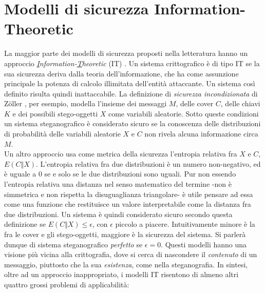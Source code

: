 	\section{Modelli di sicurezza Information-Theoretic}
	La maggior parte dei modelli di sicurezza proposti nella letteratura hanno un approccio \textit{\underline{I}nformation-\underline{T}heoretic} (IT) \cite{sec}. Un sistema crittografico è di tipo IT se la sua sicurezza deriva dalla teoria dell'informazione, che ha come assunzione principale la potenza di calcolo illimitata dell'entità attaccante. Un sistema così definito risulta quindi inattaccabile. La definizione di \textit{sicurezza incondizionata} di Z\"oller \cite{zoller}, per esempio, modella l'insieme dei messaggi $M$, delle cover $C$, delle chiavi $K$ e dei possibili stego-oggetti $X$ come variabili aleatorie. Sotto queste condizioni un sistema steganografico è considerato sicuro se la conoscenza delle distribuzioni di probabilità delle variabili aleatorie $X$ e $C$ non rivela alcuna informazione circa $M$.\\Un altro approccio \cite{approach} usa come metrica della sicurezza l'entropia relativa fra $X$ e $C$, $E(C\Vert X)$. L'entropia relativa fra due distribuzioni è un numero non-negativo, ed è uguale a $0$ se e solo se le due distribuzioni sono uguali. Pur non essendo l'entropia relativa una distanza nel senso matematico del termine -non è simmetrica e non rispetta la disuguaglianza triangolare- è utile pensare ad essa come una funzione che restituisce un valore interpretabile come la distanza fra due distribuzioni. Un sistema è quindi considerato sicuro secondo questa definizione se $E(C\Vert X) \leq \epsilon$, con $\epsilon$ piccolo a piacere. Intuitivamente minore è la  fra le cover e gli stego-oggetti, maggiore è la sicurezza del sistema. Si parlerà dunque di sistema steganografico \textit{perfetto} se $\epsilon = 0$. Questi modelli hanno una visione più vicina alla crittografia, dove si cerca di nascondere il \textit{contenuto} di un messaggio, piuttosto che la sua \textit{esistenza}, come nella steganografia. In sintesi, oltre ad un approccio inappropriato, i modelli IT risentono di almeno altri quattro grossi problemi di applicabilità:
